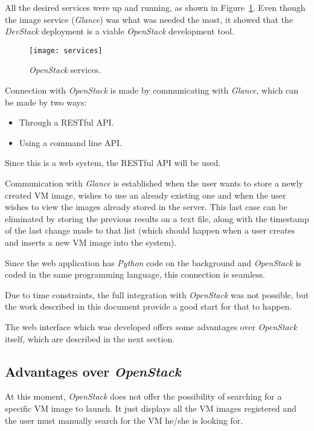 All the desired services were up and running, as shown in Figure~\ref{fig:services}. Even though the image service (\textit{Glance}) was what was needed the most, it showed that the \textit{DevStack} deployment is a viable \textit{OpenStack} development tool.

\begin{figure}[h]
  \begin{center}
    \leavevmode
    \texttt{[image: services]}
    \caption{\textit{OpenStack} services.}
    \label{fig:services}
  \end{center}
\end{figure}

Connection with \textit{OpenStack} is made by communicating with \textit{Glance}, which can be made by two ways:

\begin{itemize}
\item Through a RESTful API.
\item Using a command line API.
\end{itemize} 

Since this is a web system, the RESTful API will be used.

Communication with \textit{Glance} is established when the user wants to store a newly created VM image, wishes to use an already existing one and when the user wishes to view the images already stored in the server. This last case can be eliminated by storing the previous results on a text file, along with the timestamp of the last change made to that list (which should happen when a user creates and inserts a new VM image into the system).

Since the web application has \textit{Python} code on the background and \textit{OpenStack} is coded in the same programming language, this connection is seamless.

Due to time constraints, the full integration with \textit{OpenStack} was not possible, but the work described in this document provide a good start for that to happen.

The web interface which was developed offers some advantages over \textit{OpenStack} itself, which are described in the next section.

\clearpage
\subsection{Advantages over \textit{OpenStack}}

At this moment, \textit{OpenStack} does not offer the possibility of searching for a specific VM image to launch. It just displays all the VM images registered and the user must manually search for the VM he/she is looking for.

